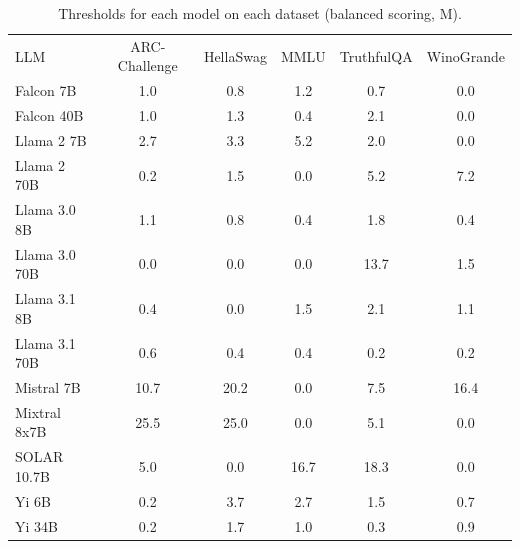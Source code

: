 \begin{table}[h]
\caption{Thresholds for each model on each dataset (balanced scoring, M). }
\label{tab:thresholds_logit_margin_k20_w1}
\centering
\begin{tabular}{l S[table-format=3.1] S[table-format=3.1] S[table-format=3.1] S[table-format=3.1] S[table-format=3.1]}
\toprule
LLM & ARC-Challenge & HellaSwag & MMLU & TruthfulQA & WinoGrande \\ 
\cmidrule(lr){1-1} \cmidrule(lr){2-2} \cmidrule(lr){3-3} \cmidrule(lr){4-4} \cmidrule(lr){5-5} \cmidrule(lr){6-6}
Falcon 7B & 1.0 & 0.8 & 1.2 & 0.7 & 0.0\\
Falcon 40B & 1.0 & 1.3 & 0.4 & 2.1 & 0.0\\
Llama 2 7B & 2.7 & 3.3 & 5.2 & 2.0 & 0.0\\
Llama 2 70B & 0.2 & 1.5 & 0.0 & 5.2 & 7.2\\
Llama 3.0 8B & 1.1 & 0.8 & 0.4 & 1.8 & 0.4\\
Llama 3.0 70B & 0.0 & 0.0 & 0.0 & 13.7 & 1.5\\
Llama 3.1 8B & 0.4 & 0.0 & 1.5 & 2.1 & 1.1\\
Llama 3.1 70B & 0.6 & 0.4 & 0.4 & 0.2 & 0.2\\
Mistral 7B & 10.7 & 20.2 & 0.0 & 7.5 & 16.4\\
Mixtral 8x7B & 25.5 & 25.0 & 0.0 & 5.1 & 0.0\\
SOLAR 10.7B & 5.0 & 0.0 & 16.7 & 18.3 & 0.0\\
Yi 6B & 0.2 & 3.7 & 2.7 & 1.5 & 0.7\\
Yi 34B & 0.2 & 1.7 & 1.0 & 0.3 & 0.9\\
\bottomrule
\end{tabular}
\end{table}
